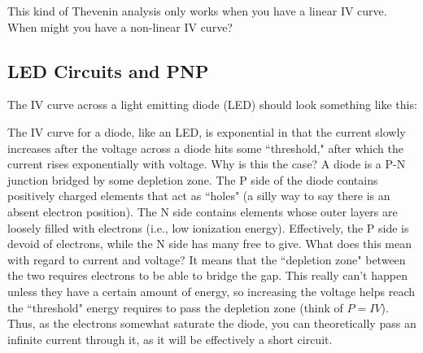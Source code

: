 This kind of Thevenin analysis only works when you have a linear IV curve. When might you have a non-linear IV curve?

\subsection{LED Circuits and PNP}

The IV curve across a light emitting diode (LED) should look something like this: 

\begin{centering}

    
\end{centering}


The IV curve for a diode, like an LED, is exponential in that the current slowly increases after the voltage across a diode hits some ``threshold," after which the current rises exponentially with voltage. Why is this the case? A diode is a P-N junction bridged by some depletion zone. The P side of the diode contains positively charged elements that act as ``holes" (a silly way to say there is an absent electron position). The N side contains elements whose outer layers are loosely filled with electrons (i.e., low ionization energy). Effectively, the P side is devoid of electrons, while the N side has many free to give. What does this mean with regard to current and voltage? It means that the ``depletion zone" between the two requires electrons to be able to bridge the gap. This really can't happen unless they have a certain amount of energy, so increasing the voltage helps reach the ``threshold" energy requires to pass the depletion zone (think of $P = IV$). Thus, as the electrons somewhat saturate the diode, you can theoretically pass an infinite current through it, as it will be effectively a short circuit. 

